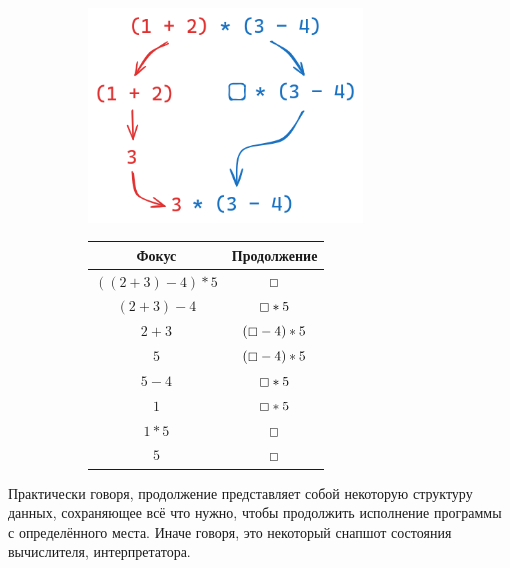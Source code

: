 \begin{figure}[h]
    \centering
    \begin{subfigure}[h]{0.4\linewidth}
        \includegraphics[width=0.8\textwidth]{figs/cont-expr}
    \end{subfigure}
    \begin{subfigure}[h]{0.4\linewidth}
        \begin{tabular}{|c|c|}
            \hline
            Фокус               & Продолжение           \\
            \hline
            $((2 + 3) - 4) * 5$ & $\boxempty$           \\
            $(2 + 3) - 4$       & $\boxempty * 5$       \\
            $2 + 3$             & $(\boxempty - 4) * 5$ \\
            $5$                 & $(\boxempty - 4) * 5$ \\
            $5 - 4$             & $\boxempty * 5$       \\
            $1$                 & $\boxempty * 5$       \\
            $1 * 5$             & $\boxempty$           \\
            $5$                 & $\boxempty$           \\
            \hline
        \end{tabular}
    \end{subfigure}
\end{figure}

Практически говоря, продолжение представляет собой некоторую структуру данных, сохраняющее всё что нужно, чтобы продолжить исполнение программы с определённого места.
Иначе говоря, это некоторый снапшот состояния вычислителя, интерпретатора.

